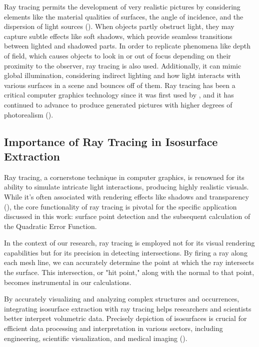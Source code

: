 Ray tracing permits the development of very realistic pictures by considering elements like the material qualities of surfaces, the angle of incidence, and the dispersion of light sources (\cite{Haines_Akenine_2019}). When objects partly obstruct light, they may capture subtle effects like soft shadows, which provide seamless transitions between lighted and shadowed parts. In order to replicate phenomena like depth of field, which causes objects to look in or out of focus depending on their proximity to the observer, ray tracing is also used. Additionally, it can mimic global illumination, considering indirect lighting and how light interacts with various surfaces in a scene and bounces off of them. Ray tracing has been a critical computer graphics technology since it was first used by \cite{Glassner_1989}, and it has continued to advance to produce generated pictures with higher degrees of photorealism (\cite{Haines_Akenine_2019}).

\subsection{Importance of Ray Tracing in Isosurface Extraction} 
Ray tracing, a cornerstone technique in computer graphics, is renowned for its ability to simulate intricate light interactions, producing highly realistic visuals. While it's often associated with rendering effects like shadows and transparency (\cite{Parker_1999}), the core functionality of ray tracing is pivotal for the specific application discussed in this work: surface point detection and the subsequent calculation of the Quadratic Error Function.

In the context of our research, ray tracing is employed not for its visual rendering capabilities but for its precision in detecting intersections. By firing a ray along each mesh line, we can accurately determine the point at which the ray intersects the surface. This intersection, or "hit point," along with the normal to that point, becomes instrumental in our calculations.

By accurately visualizing and analyzing complex structures and occurrences, integrating isosurface extraction with ray tracing helps researchers and scientists better interpret volumetric data. Precisely depiction of isosurfaces is crucial for efficient data processing and interpretation in various sectors, including engineering, scientific visualization, and medical imaging (\cite{Dai_2021}).

